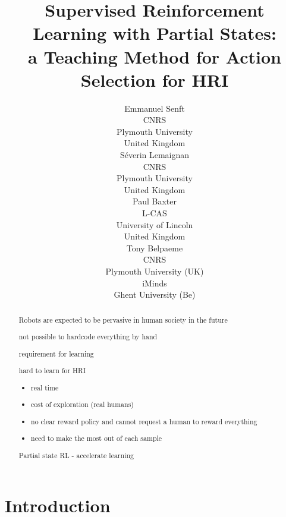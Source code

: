 \documentclass[letterpaper]{article} %
\begin{document}
%
\title{Supervised Reinforcement Learning with Partial States: \\
 a Teaching Method for Action Selection for HRI}

\author{Emmanuel Senft \\
CNRS \\
Plymouth University \\
United Kingdom\\
\And S\'{e}verin Lemaignan\\
CNRS \\
Plymouth University \\
United Kingdom\\
\And Paul Baxter\\
L-CAS\\
University of Lincoln\\
United Kingdom\\
 \And Tony Belpaeme\\
 CNRS\\ Plymouth University (UK) \\ iMinds \\ Ghent University (Be)}

\maketitle
\begin{abstract}
Robots are expected to be pervasive in human society in the future

not possible to hardcode everything by hand

requirement for learning

hard to learn for HRI
\begin{itemize}
	\item real time
	\item cost of exploration (real humans)
	\item no clear reward policy and cannot request a human to reward everything
	\item need to make the most out of each sample
\end{itemize}

Partial state RL - accelerate learning


\end{abstract}

\section{Introduction}
\end{document}

